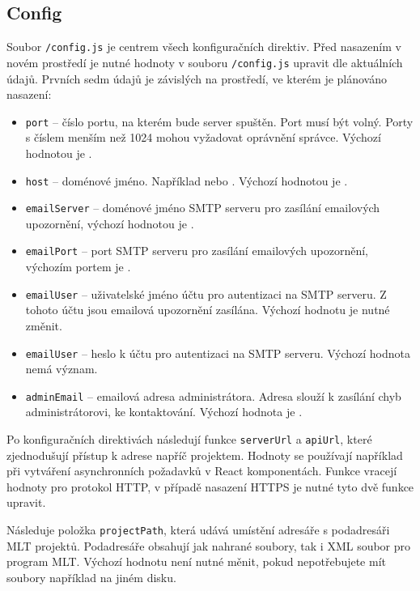 \subsection{Config\label{cap:config}}
Soubor \texttt{/config.js} je centrem všech konfiguračních direktiv.  Před nasazením v novém prostředí je nutné hodnoty v souboru \texttt{/config.js} upravit dle aktuálních údajů. Prvních sedm údajů je závislých na prostředí, ve kterém je plánováno nasazení:
\begin{itemize}
\item \texttt{port} -- číslo portu, na kterém bude server spuštěn. Port musí být volný. Porty s číslem menším než 1024 mohou vyžadovat oprávnění správce. Výchozí hodnotou je .
\item \texttt{host} -- doménové jméno. Například  nebo . Výchozí hodnotou je .
\item \texttt{emailServer} -- doménové jméno SMTP serveru pro zasílání emailových upozornění, výchozí hodnotou je .
\item \texttt{emailPort} -- port SMTP serveru pro zasílání emailových upozornění, výchozím portem je .
\item \texttt{emailUser} -- uživatelské jméno účtu pro autentizaci na SMTP serveru. Z tohoto účtu jsou emailová upozornění zasílána. Výchozí hodnotu  je nutné změnit.
\item \texttt{emailUser} -- heslo k účtu pro autentizaci na SMTP serveru. Výchozí hodnota nemá význam.
\item \texttt{adminEmail} -- emailová adresa administrátora. Adresa slouží k zasílání chyb administrátorovi, ke kontaktování. Výchozí hodnota je .
\end{itemize}

Po konfiguračních direktivách následují funkce \texttt{serverUrl} a \texttt{apiUrl}, které zjednodušují přístup k adrese napříč projektem. Hodnoty se používají například při vytváření asynchronních požadavků v React komponentách. Funkce vracejí hodnoty pro protokol HTTP, v případě nasazení HTTPS je nutné tyto dvě funkce upravit.

Následuje položka \texttt{projectPath}, která udává umístění adresáře s podadresáři MLT projektů. Podadresáře obsahují jak nahrané soubory, tak i XML soubor pro program MLT. Výchozí hodnotu  není nutné měnit, pokud nepotřebujete mít soubory například na jiném disku.

